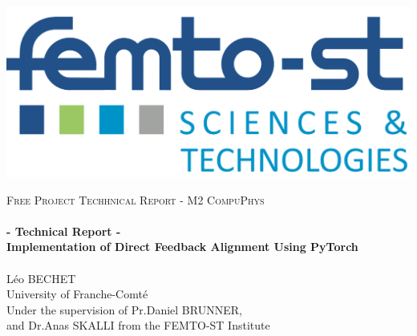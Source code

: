 \documentclass[english]{article}
\begin{document}
\begin{titlepage}
\begin{center}
        \hspace{1cm}
        \includegraphics[scale=0.04]{rsc/logos/femto.png}
        \hspace{1cm}
\end{center}

    \vbox{ }

    \vbox{ }

    \begin{center}
                
        \textsc{\Large Free Project Techhnical Report - M2 CompuPhys}\\[1cm]

        \noindent\makebox[\linewidth]{\rule{.7\paperwidth}{.6pt}}\\[0.7cm]
        { \Huge \bfseries - Technical Report - \\ Implementation of Direct Feedback Alignment Using PyTorch}\\[0.25cm]
        \noindent\makebox[\linewidth]{\rule{.7\paperwidth}{.6pt}}\\[0.7cm]
        \LARGE{Léo BECHET}\\
        \small{University of Franche-Comté}\\[1.2cm]
        
        \vfill
        \large
        \Large{Under the supervision of Pr.Daniel BRUNNER,\\
        and Dr.Anas SKALLI from the FEMTO-ST Institute}

    \end{center}
\end{titlepage}

\newpage
\tableofcontents
\newpage

\end{document}
